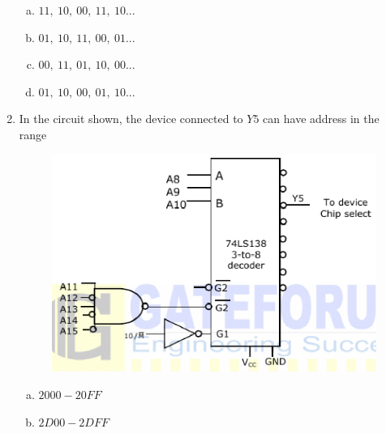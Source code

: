 \documentclass[journal,12pt,twocolumn]{IEEEtran}
\begin{document}
\begin{enumerate}
\begin{figure}
\caption{}

\label{fig:37}

\end{figure} 


\begin{enumerate}[(a)]
 
\item $ 11,\ 10,\ 00,\ 11,\ 10 ... $

\item $ 01,\ 10,\ 11,\ 00,\ 01 ... $

\item $ 00,\ 11,\ 01,\ 10,\ 00 ... $

\item $ 01,\ 10,\ 00,\ 01,\ 10 ... $

\end{enumerate}
 
\item In the circuit shown, the device connected to $Y5$ can have address in the range


\begin{figure}

\centering

\includegraphics[width=\columnwidth]{./figs/43.eps}

\caption{}

\label{fig:38}

\end{figure} 



\begin{enumerate}[(a)]

\item $ 2000 - 20FF $

\item $ 2D00 - 2DFF $


\end{enumerate}
\end{enumerate}
\end{document}
